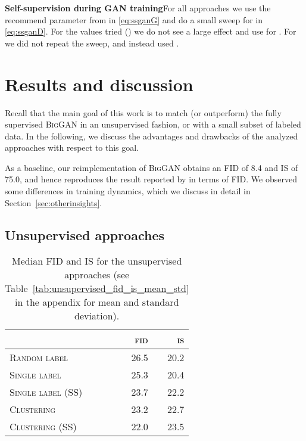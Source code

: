 \documentclass{article}
\newcommand{\tranC}{\textsc{Clustering}}
\newcommand{\slabels}{\textsc{Single label}}
\newcommand{\rlabels}{\textsc{Random label}}
\newcommand{\biggan}{\textsc{BigGAN}}
\begin{document}
\textbf{Self-supervision during GAN training}\quad For all approaches we use the recommend parameter  from \cite{chen2019self} in \eqref{eq:ssganG} and do a small sweep for  in \eqref{eq:ssganD}. For the values tried () we do not see a large effect and use  for . For  we did not repeat the sweep, and instead used .

\section{Results and discussion}

Recall that the main goal of this work is to match (or outperform) the fully supervised \biggan{} in an unsupervised fashion, or with a small subset of labeled data. 
In the following, we discuss the advantages and drawbacks of the analyzed approaches with respect to this goal.

As a baseline, our reimplementation of \biggan{} obtains an FID of 8.4 and IS of 75.0, and hence reproduces the result reported by \citet{brock2018large} in terms of FID. We observed some differences in training dynamics, which we discuss in detail in Section~\ref{sec:otherinsights}. 

\subsection{Unsupervised approaches}
\begin{table}[b]
\centering
\caption{Median FID and IS for the unsupervised approaches (see Table~\ref{tab:unsupervised_fid_is_mean_std} in the appendix for mean and standard deviation).\vspace{0.2cm}}
\setlength\tabcolsep{4.5pt}
\begin{tabular}{lrr}
\toprule
{} & \textsc{fid} & \textsc{is} \\\midrule
\rlabels{}        &           26.5 &                 20.2 \\\midrule
\slabels{}        &           25.3 &                 20.4 \\
\slabels{} (SS)   &           23.7 &                 22.2 \\\midrule
\tranC{}          &           23.2 &                 22.7 \\
\tranC{} (SS)     &           22.0 &                 23.5 \\
\bottomrule
\end{tabular} \label{tab:unsupervised}
\end{table}
\end{document}
